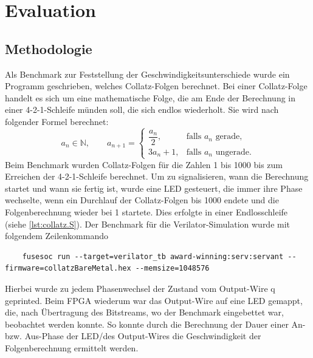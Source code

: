 \chapter{Evaluation}

\section{Methodologie} \label{collatz-erklärung}
    Als Benchmark zur Feststellung der Geschwindigkeitsunterschiede wurde ein Programm geschrieben, welches Collatz-Folgen berechnet.
    Bei einer Collatz-Folge handelt es sich um eine mathematische Folge, die am Ende der Berechnung in einer 4-2-1-Schleife münden soll, die sich endlos wiederholt.
    Sie wird nach folgender Formel berechnet:
    \[
    a_n \in \mathbb{N},\qquad
    a_{n+1} =
    \begin{cases}
    \dfrac{a_n}{2}, & \text{falls } a_n \text{ gerade},\\[0.8em]
    3a_n + 1, & \text{falls } a_n \text{ ungerade}.
    \end{cases}
    \]
    Beim Benchmark wurden Collatz-Folgen für die Zahlen 1 bis 1000 bis zum Erreichen der 4-2-1-Schleife berechnet.
    Um zu signalisieren, wann die Berechnung startet und wann sie fertig ist, wurde eine LED gesteuert, die immer ihre Phase wechselte, wenn ein Durchlauf der Collatz-Folgen bis 1000 endete und die Folgenberechnung wieder bei 1 startete.
    Dies erfolgte in einer Endlosschleife (siehe \cref{lst:collatz.S}).
    Der Benchmark für die Verilator-Simulation wurde mit folgendem Zeilenkommando
    \begin{verbatim}
    fusesoc run --target=verilator_tb award-winning:serv:servant --firmware=collatzBareMetal.hex --memsize=1048576
    \end{verbatim}
    Hierbei wurde zu jedem Phasenwechsel der Zustand vom Output-Wire q geprinted.
    Beim FPGA wiederum war das Output-Wire auf eine LED gemappt, die, nach Übertragung des Bitstreams, wo der Benchmark eingebettet war, beobachtet werden konnte.
    So konnte durch die Berechnung der Dauer einer An- bzw. Aus-Phase der LED/des Output-Wires die Geschwindigkeit der Folgenberechnung ermittelt werden.

